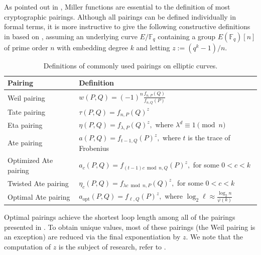 As pointed out in , Miller functions are essential to the definition of most
cryptographic pairings. Although all pairings can be defined individually in
formal terms, it is more instructive to give the following constructive
definitions in  based on \cite{AranhaBLR2013}, assuming an underlying curve $E/\mathbb{F}_q$ containing a group
$E(\mathbb{F}_q)[n]$ of prime order $n$ with embedding degree $k$ and letting
$z := (q^k - 1)/n$.


\begin{table}[ht]
	\centering
	\caption{Definitions of commonly used pairings on elliptic curves.}
	\label{tab:mostcommonpairings}
	\begin{tabular}{|l|l|}
		\hline
		\textbf{Pairing} & \textbf{Definition} \\
		\hline
		Weil pairing &
		$\displaystyle w(P,Q)=(-1)^n\frac{f_{n,P}(Q)}{f_{n,Q}(P)}$ \\
		\hline
		Tate pairing &
		$\displaystyle \tau(P,Q)=f_{n,P}(Q)^z$ \\
		\hline
		Eta pairing &
		$\displaystyle \eta(P,Q)=f_{\lambda,P}(Q)^z,$
		where $\lambda^d \equiv 1 \pmod n$ \\
		\hline
		Ate pairing &
		$\displaystyle a(P,Q)=f_{t-1,Q}(P)^z,$
		where $t$ is the trace of Frobenius \\
		\hline
		Optimized Ate pairing &
		$\displaystyle a_c(P,Q)=f_{(t-1)c \bmod n,Q}(P)^z,$
		for some $0<c<k$ \\
		\hline
		Twisted Ate pairing &
		$\displaystyle \eta_c(P,Q)=f_{\lambda c \bmod n,P}(Q)^z,$
		for some $0<c<k$ \\
		\hline
		Optimal Ate pairing &
		$\displaystyle a_{\mathrm{opt}}(P,Q)=f_{\ell,Q}(P)^z,$
		where $\log_2\ell \approx \frac{\log_2 n}{\varphi(k)}$ \\
		\hline
	\end{tabular}
\end{table}

Optimal pairings achieve the shortest loop length among all of the pairings presented in . To
obtain unique values, most of these pairings (the Weil pairing is an exception)
are reduced via the final exponentiation by $z$. We note that the computation of $z$ is the subject of research, refer to \cite{ScottEtAlPairing2009}.


